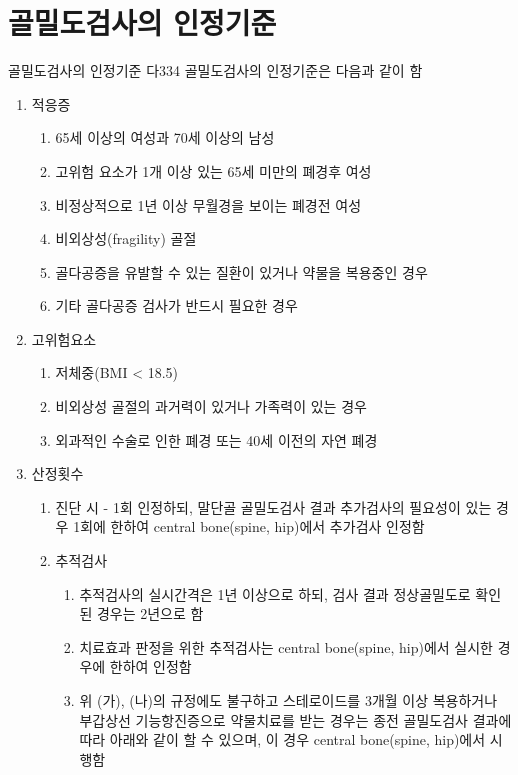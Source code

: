 ﻿\section{골밀도검사의 인정기준}

\begin{commentbox}{골밀도검사의 인정기준}
다334 골밀도검사의 인정기준은 다음과 같이 함
\begin{enumerate}[가.]\tightlist
\item 적응증
	\begin{enumerate}[(1)]\tightlist
	\item 65세 이상의 여성과 70세 이상의 남성
	\item 고위험 요소가 1개 이상 있는 65세 미만의 폐경후 여성
	\item 비정상적으로 1년 이상 무월경을 보이는 폐경전 여성
	\item 비외상성(fragility) 골절
	\item 골다공증을 유발할 수 있는 질환이 있거나 약물을 복용중인 경우
	\item 기타 골다공증 검사가 반드시 필요한 경우
	\end{enumerate}	
\item 고위험요소
	\begin{enumerate}[1.]\tightlist
	\item 저체중(BMI < 18.5)
	\item 비외상성 골절의 과거력이 있거나 가족력이 있는 경우
	\item 외과적인 수술로 인한 폐경 또는 40세 이전의 자연 폐경
	\end{enumerate}
\item 산정횟수
	\begin{enumerate}[(1)]\tightlist
	\item 진단 시 - 1회 인정하되, 말단골 골밀도검사 결과 추가검사의 필요성이 있는 경우 1회에 한하여 central bone(spine, hip)에서 추가검사 인정함
	\item 추적검사
		\begin{enumerate}[(가)]\tightlist
		\item 추적검사의 실시간격은 1년 이상으로 하되, 검사 결과 정상골밀도로 확인된 경우는 2년으로 함
		\item 치료효과 판정을 위한 추적검사는 central bone(spine, hip)에서 실시한 경우에 한하여 인정함
		\item 위 (가), (나)의 규정에도 불구하고 스테로이드를 3개월 이상 복용하거나 부갑상선 기능항진증으로 약물치료를 받는 경우는 종전 골밀도검사 결과에 따라 아래와 같이 할 수 있으며, 이 경우 central bone(spine, hip)에서 시행함\newline

\end{enumerate}
\end{enumerate}
\end{enumerate}
\end{commentbox}
